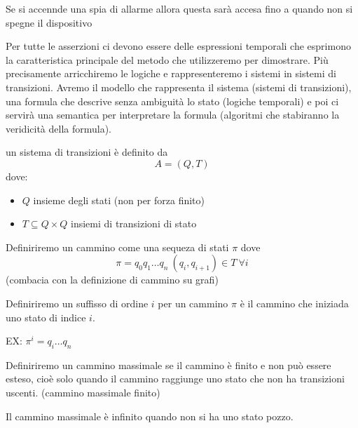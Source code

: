 \begin{esempio}
    Se si accennde una spia di allarme allora questa sarà accesa fino a quando non 
    si spegne il dispositivo
\end{esempio}

Per tutte le asserzioni ci devono essere delle espressioni temporali che esprimono
la caratteristica principale del metodo che utilizzeremo per dimostrare. Più precisamente
arricchiremo le logiche e rappresenteremo i sistemi in sistemi di transizioni.
Avremo il modello che rappresenta il sistema (sistemi di transizioni), una formula che descrive senza ambiguità
lo stato (logiche temporali) e poi ci servirà una semantica per interpretare la formula (algoritmi che stabiranno la veridicità della formula).

\begin{definizione}
    un sistema di transizioni è definito da 
    \begin{equation}
        A=(Q,T)
    \end{equation}
    dove:
    \begin{itemize}
        \item $Q$ insieme degli stati (non per forza finito)
        \item $T\subseteq Q\times Q$ insiemi di transizioni di stato
    \end{itemize}

\end{definizione}

\begin{definizione}
    Definiriremo un cammino come una sequeza di stati $\pi$ dove
    \begin{equation}
        \pi = q_0q_1\dots q_n \ (q_i,q_{i+1})\in T \ \forall i
    \end{equation}
    (combacia con la definizione di cammino su grafi)
\end{definizione}

\begin{definizione}
    Definiriremo un suffisso di ordine $i$ per un cammino $\pi$ è il cammino che 
    iniziada uno stato di indice $i$.
    
    EX: $\pi^i = q_i\dots q_n$ 
\end{definizione}

\begin{definizione}
    Definiriremo un cammino massimale se il cammino è finito e non può essere esteso,
    cioè solo quando il cammino raggiunge uno stato che non ha transizioni uscenti. (cammino massimale finito)
\end{definizione}
Il cammino massimale è infinito quando non si ha uno stato pozzo.

